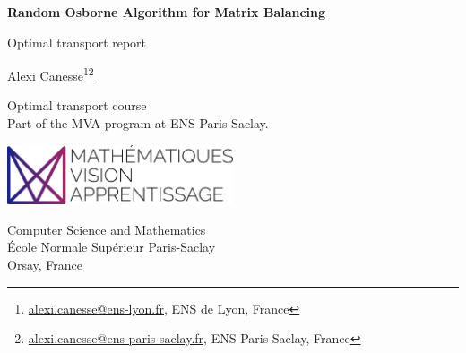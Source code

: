 \renewcommand{\today}{\number\day\textsuperscript{\scriptsize\text{th}} \DTMenglishmonthname{\month} \number\year}


\makeatletter
\newcommand\setxveclength[5]{%
    \pgfpointdiff{#2}{#3}
    \edef#1{\the\pgf@x}
}
\makeatother

\sloppy                  

\pgfplotsset{compat=1.16}








\begin{titlepage}
    \begin{center}
        \vspace*{1cm}
            
        \Huge
        \textbf{Random Osborne Algorithm for Matrix Balancing}
            
        \vspace{0.5cm}
        \LARGE
        Optimal transport report
            
        \vspace{2.5cm}
            
        \huge {\sc Alexi Canesse\footnote{\href{mailto:alexi.canesse@ens-lyon.fr}{alexi.canesse@ens-lyon.fr}, ENS de Lyon, France}\footnote{\href{mailto:alexi.canesse@ens-paris-saclay.fr}{alexi.canesse@ens-paris-saclay.fr}, ENS Paris-Saclay, France}}\\\Large
            
        \vfill

        Optimal transport course\\
        Part of the MVA program at ENS Paris-Saclay.
            
        \vspace{2cm}
        \includegraphics[width=0.5\textwidth]{./figures/logo.pdf}
        \vspace{2cm}

        \Large
        Computer Science and Mathematics\\
        École Normale Supérieur Paris-Saclay\\
        Orsay, France\\
        \today
            
    \end{center}
\end{titlepage}





